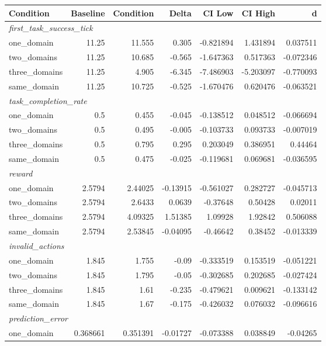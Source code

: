 \begin{tabular}{lrrrrrr}
\toprule
Condition & Baseline & Condition & Delta & CI Low & CI High & d \\
\midrule
  \multicolumn{7}{l}{\textit{first_task_success_tick}} \\
  one_domain & 11.25 & 11.555 & 0.305 & -0.821894 & 1.431894 & 0.037511 \\
  two_domains & 11.25 & 10.685 & -0.565 & -1.647363 & 0.517363 & -0.072346 \\
  three_domains & 11.25 & 4.905 & -6.345 & -7.486903 & -5.203097 & -0.770093 \\
  same_domain & 11.25 & 10.725 & -0.525 & -1.670476 & 0.620476 & -0.063521 \\
  \multicolumn{7}{l}{\textit{task_completion_rate}} \\
  one_domain & 0.5 & 0.455 & -0.045 & -0.138512 & 0.048512 & -0.066694 \\
  two_domains & 0.5 & 0.495 & -0.005 & -0.103733 & 0.093733 & -0.007019 \\
  three_domains & 0.5 & 0.795 & 0.295 & 0.203049 & 0.386951 & 0.44464 \\
  same_domain & 0.5 & 0.475 & -0.025 & -0.119681 & 0.069681 & -0.036595 \\
  \multicolumn{7}{l}{\textit{reward}} \\
  one_domain & 2.5794 & 2.44025 & -0.13915 & -0.561027 & 0.282727 & -0.045713 \\
  two_domains & 2.5794 & 2.6433 & 0.0639 & -0.37648 & 0.50428 & 0.02011 \\
  three_domains & 2.5794 & 4.09325 & 1.51385 & 1.09928 & 1.92842 & 0.506088 \\
  same_domain & 2.5794 & 2.53845 & -0.04095 & -0.46642 & 0.38452 & -0.013339 \\
  \multicolumn{7}{l}{\textit{invalid_actions}} \\
  one_domain & 1.845 & 1.755 & -0.09 & -0.333519 & 0.153519 & -0.051221 \\
  two_domains & 1.845 & 1.795 & -0.05 & -0.302685 & 0.202685 & -0.027424 \\
  three_domains & 1.845 & 1.61 & -0.235 & -0.479621 & 0.009621 & -0.133142 \\
  same_domain & 1.845 & 1.67 & -0.175 & -0.426032 & 0.076032 & -0.096616 \\
  \multicolumn{7}{l}{\textit{prediction_error}} \\
  one_domain & 0.368661 & 0.351391 & -0.01727 & -0.073388 & 0.038849 & -0.04265 \\

\end{tabular}
